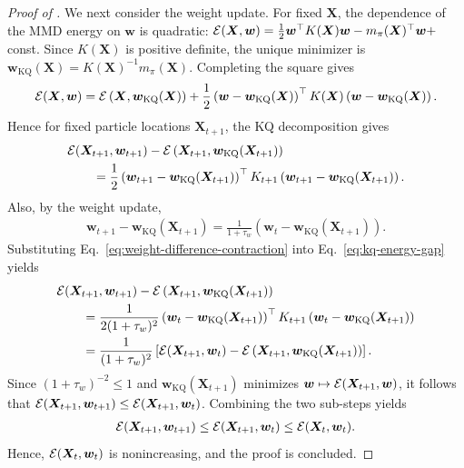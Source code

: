 \begin{proof}[Proof of ]
We next consider the weight update. For fixed $\bm{X}$, the dependence of the MMD energy on $\bm{w}$ is quadratic:
$\mathcal{E}(\bm{X},\bm{w})=\frac12 \bm{w}^\top K(\bm{X})\bm{w}-m_\pi(\bm{X})^\top \bm{w}+$const. Since $K(\bm{X})$ is positive definite, the unique minimizer is
$\bm{w}_{\mathrm{KQ}}(\bm{X})=K(\bm{X})^{-1}m_\pi(\bm{X})$.
Completing the square gives
\begin{align}
\mathcal{E}(\bm{X},\bm{w})
=
\mathcal{E}\left(\bm{X},\bm{w}_{\mathrm{KQ}}(\bm{X})\right)
+
\frac12 \left( \bm{w}-\bm{w}_{\mathrm{KQ}}(\bm{X}) \right)^\top K(\bm{X}) \left( \bm{w}-\bm{w}_{\mathrm{KQ}}(\bm{X}) \right).  
\label{eq:mmd-kq-decomposition}
\end{align}
Hence for fixed particle locations $\bm{X}_{t+1}$, the KQ decomposition gives
\begin{align}
&
\mathcal{E}(\bm{X}_{t+1},\bm{w}_{t+1})
-
\mathcal{E}\left(
\bm{X}_{t+1},
\bm{w}_{\mathrm{KQ}}(\bm{X}_{t+1})
\right)
\nonumber\\
&\qquad=
\frac{1}{2}
\left(
\bm{w}_{t+1}
-
\bm{w}_{\mathrm{KQ}}(\bm{X}_{t+1})
\right)^\top
K_{t+1}
\left(
\bm{w}_{t+1}
-
\bm{w}_{\mathrm{KQ}}(\bm{X}_{t+1})
\right).
\label{eq:kq-energy-gap}
\end{align}
Also, by the weight update,
\begin{align}
\bm{w}_{t+1} - \bm{w}_{\mathrm{KQ}}(\bm{X}_{t+1}) = \frac{1}{1+\tau_w} \left( \bm{w}_t - \bm{w}_{\mathrm{KQ}}(\bm{X}_{t+1})
\right).
\label{eq:weight-difference-contraction}
\end{align}
Substituting Eq.~\eqref{eq:weight-difference-contraction} into
Eq.~\eqref{eq:kq-energy-gap} yields
\begin{align}
&\mathcal{E}(\bm{X}_{t+1},\bm{w}_{t+1})
-
\mathcal{E} \left(
\bm{X}_{t+1},
\bm{w}_{\mathrm{KQ}}(\bm{X}_{t+1})
\right)
\nonumber\\
&\qquad=
\frac{1}{2(1+\tau_w)^2}
\left(
\bm{w}_t -
\bm{w}_{\mathrm{KQ}}(\bm{X}_{t+1})
\right)^\top
K_{t+1}
\left(
\bm{w}_t
-
\bm{w}_{\mathrm{KQ}}(\bm{X}_{t+1})
\right)
\nonumber\\
&\qquad=
\frac{1}{(1+\tau_w)^2}
\left[ \mathcal{E}(\bm{X}_{t+1},\bm{w}_t)
-
\mathcal{E}\left(
\bm{X}_{t+1},
\bm{w}_{\mathrm{KQ}}(\bm{X}_{t+1})
\right)
\right].
\label{eq:kq-weight-contraction}
\end{align}
Since $(1+\tau_w)^{-2}\leq1$ and $\bm{w}_{\mathrm{KQ}}(\bm{X}_{t+1})$ minimizes
$\bm{w}\mapsto\mathcal{E}(\bm{X}_{t+1}, \bm{w})$, it follows that
$\mathcal{E}(\bm{X}_{t+1},\bm{w}_{t+1})
\leq
\mathcal{E}(\bm{X}_{t+1},\bm{w}_t)$.
Combining the two sub-steps yields
\begin{align}
\mathcal{E}(\bm{X}_{t+1},\bm{w}_{t+1})
\leq
\mathcal{E}(\bm{X}_{t+1},\bm{w}_t)
\leq
\mathcal{E}(\bm{X}_t,\bm{w}_t).
\label{eq:full-wift-descent}
\end{align}
Hence, $\mathcal{E}(\bm{X}_t,\bm{w}_t)$ is nonincreasing, and the proof is concluded.
\end{proof}

